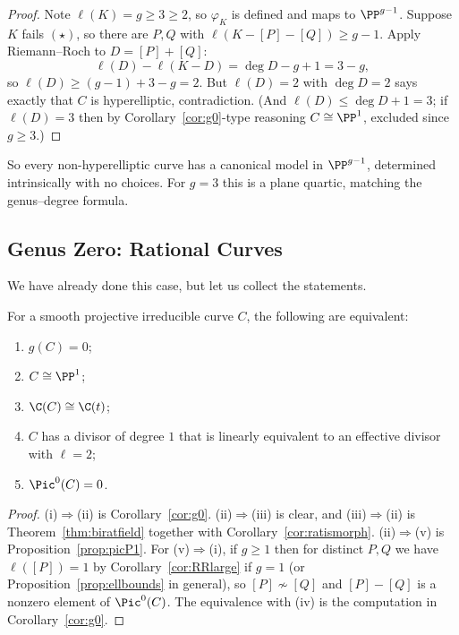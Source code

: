 \begin{proof}
	Note $\ell(K) = g \geq 3 \geq 2$, so $\varphi_K$ is defined and maps to $\PP^{g-1}$. Suppose $K$ fails $(\star)$, so there are $P,Q$ with $\ell(K - [P]-[Q]) \geq g - 1$. Apply Riemann--Roch to $D = [P]+[Q]$:
	$$\ell(D) - \ell(K-D) = \deg D - g + 1 = 3 - g,$$
	so $\ell(D) \geq (g-1) + 3 - g = 2$. But $\ell(D) = 2$ with $\deg D = 2$ says exactly that $C$ is hyperelliptic, contradiction. (And $\ell(D)\leq \deg D + 1 = 3$; if $\ell(D) = 3$ then by Corollary~\ref{cor:g0}-type reasoning $C\cong\PP^1$, excluded since $g \geq 3$.)
\end{proof}

So every non-hyperelliptic curve has a canonical model in $\PP^{g-1}$, determined intrinsically with no choices. For $g = 3$ this is a plane quartic, matching the genus--degree formula.

\subsection{Genus Zero: Rational Curves}

We have already done this case, but let us collect the statements.

\begin{theorem}
	For a smooth projective irreducible curve $C$, the following are equivalent:
	\begin{enumerate}[label=(\roman*)]
		\item $g(C) = 0$;
		\item $C \cong \PP^1$;
		\item $\C(C) \cong \C(t)$;
		\item $C$ has a divisor of degree $1$ that is linearly equivalent to an effective divisor with $\ell = 2$;
		\item $\Pic^0(C) = 0$.
	\end{enumerate}
\end{theorem}

\begin{proof}
	(i)$\Rightarrow$(ii) is Corollary~\ref{cor:g0}. (ii)$\Rightarrow$(iii) is clear, and (iii)$\Rightarrow$(ii) is Theorem~\ref{thm:biratfield} together with Corollary~\ref{cor:ratismorph}. (ii)$\Rightarrow$(v) is Proposition~\ref{prop:picP1}. For (v)$\Rightarrow$(i), if $g \geq 1$ then for distinct $P,Q$ we have $\ell([P]) = 1$ by Corollary~\ref{cor:RRlarge} if $g = 1$ (or Proposition~\ref{prop:ellbounds} in general), so $[P]\not\sim[Q]$ and $[P]-[Q]$ is a nonzero element of $\Pic^0(C)$. The equivalence with (iv) is the computation in Corollary~\ref{cor:g0}.
\end{proof}

